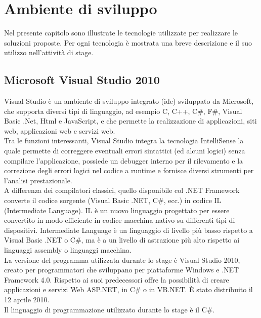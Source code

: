 
\chapter{Ambiente di sviluppo}
\label{cap:ambiente-sviluppo}

Nel presente capitolo sono illustrate le tecnologie utilizzate per realizzare le soluzioni proposte. Per ogni tecnologia è mostrata una breve descrizione e il suo utilizzo nell'attività di stage.
\section{Microsoft Visual Studio 2010}
Visual Studio è un ambiente di sviluppo integrato (\gls{ide}) sviluppato da Microsoft, che supporta diversi tipi di linguaggio, ad esempio C, C++, C\#, F\#, Visual Basic .Net, Html e JavaScript, e che permette la realizzazione di applicazioni, siti web, applicazioni web e servizi web.
\\
Tra le funzioni interessanti, Visual Studio integra la tecnologia IntelliSense la quale permette di correggere eventuali errori sintattici (ed alcuni logici) senza compilare l'applicazione, possiede un debugger interno per il rilevamento e la correzione degli errori logici nel codice a runtime e fornisce diversi strumenti per l'analisi prestazionale.
\\
A differenza dei compilatori classici, quello disponibile col .NET Framework converte il codice sorgente (Visual Basic .NET, C\#, ecc.) in codice IL (Intermediate Language).
IL è un nuovo linguaggio progettato per essere convertito in modo efficiente in codice macchina nativo su differenti tipi di dispositivi. Intermediate Language è un linguaggio di livello più basso rispetto a Visual Basic .NET o C\#, ma è a un livello di astrazione più alto rispetto ai linguaggi assembly o linguaggi macchina.
\\
La versione del programma utilizzata durante lo stage è Visual Studio 2010, creato per programmatori che sviluppano per piattaforme Windows e .NET Framework 4.0. Rispetto ai suoi predecessori offre la possibilità di creare applicazioni e servizi Web ASP.NET, in C\# o in VB.NET. È stato distribuito il 12 aprile 2010. 
\\
Il linguaggio di programmazione utilizzato durante lo stage è il C\#.


